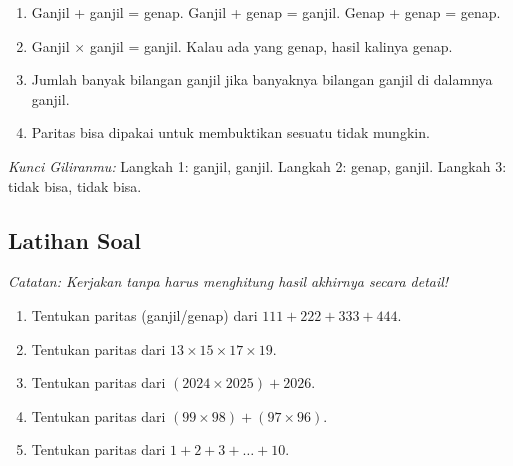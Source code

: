 \documentclass[11pt,a4paper]{article}
\begin{document}
\begin{rangkuman}
\begin{enumerate}
    \item Ganjil + ganjil = genap. Ganjil + genap = ganjil. Genap + genap = genap.
    \item Ganjil $\times$ ganjil = ganjil. Kalau ada yang genap, hasil kalinya genap.
    \item Jumlah banyak bilangan ganjil jika banyaknya bilangan ganjil di dalamnya ganjil.
    \item Paritas bisa dipakai untuk membuktikan sesuatu tidak mungkin.
\end{enumerate}
\end{rangkuman}

\textit{Kunci Giliranmu:} Langkah 1: ganjil, ganjil. \quad Langkah 2: genap, ganjil. \quad
Langkah 3: tidak bisa, tidak bisa.

\newpage
\subsection*{Latihan Soal}
\textit{Catatan: Kerjakan tanpa harus menghitung hasil akhirnya secara detail!}

\begin{enumerate}
    \item Tentukan paritas (ganjil/genap) dari $111 + 222 + 333 + 444$.
    \item Tentukan paritas dari $13 \times 15 \times 17 \times 19$.
    \item Tentukan paritas dari $(2024 \times 2025) + 2026$.
    \item Tentukan paritas dari $(99 \times 98) + (97 \times 96)$.
    \item Tentukan paritas dari $1 + 2 + 3 + \dots + 10$.
\end{enumerate}
\end{document}
